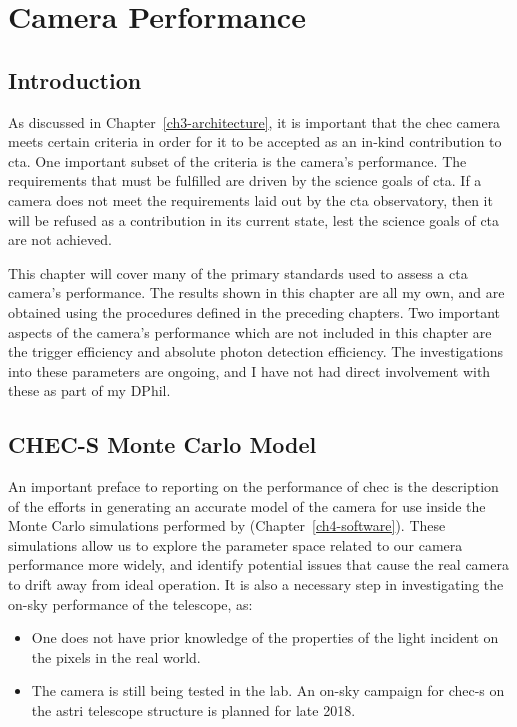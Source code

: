 \chapter{\label{ch7-performance}Camera Performance} 

\minitoc

\section{Introduction}

As discussed in Chapter~\ref{ch3-architecture}, it is important that the \gls{chec} camera meets certain criteria in order for it to be accepted as an in-kind contribution to \gls{cta}. One important subset of the criteria is the camera's performance. The requirements that must be fulfilled are driven by the science goals of \gls{cta}. If a camera does not meet the requirements laid out by the \gls{cta} observatory, then it will be refused as a contribution in its current state, lest the science goals of \gls{cta} are not achieved.

This chapter will cover many of the primary standards used to assess a \gls{cta} camera's performance. The results shown in this chapter are all my own, and are obtained using the procedures defined in the preceding chapters. Two important aspects of the camera's performance which are not included in this chapter are the trigger efficiency and absolute photon detection efficiency. The investigations into these parameters are ongoing, and I have not had direct involvement with these as part of my DPhil.

\section{CHEC-S Monte Carlo Model}

An important preface to reporting on the performance of \gls{chec} is the description of the efforts in generating an accurate model of the camera for use inside the Monte Carlo simulations performed by  (Chapter~\ref{ch4-software}). These simulations allow us to explore the parameter space related to our camera performance more widely, and identify potential issues that cause the real camera to drift away from ideal operation. It is also a necessary step in investigating the on-sky performance of the telescope, as:

\begin{itemize}
\item One does not have prior knowledge of the properties of the light incident on the pixels in the real world.
\item The camera is still being tested in the lab. An on-sky campaign for \gls{chec-s} on the \gls{astri} telescope structure is planned for late 2018.
\end{itemize}

